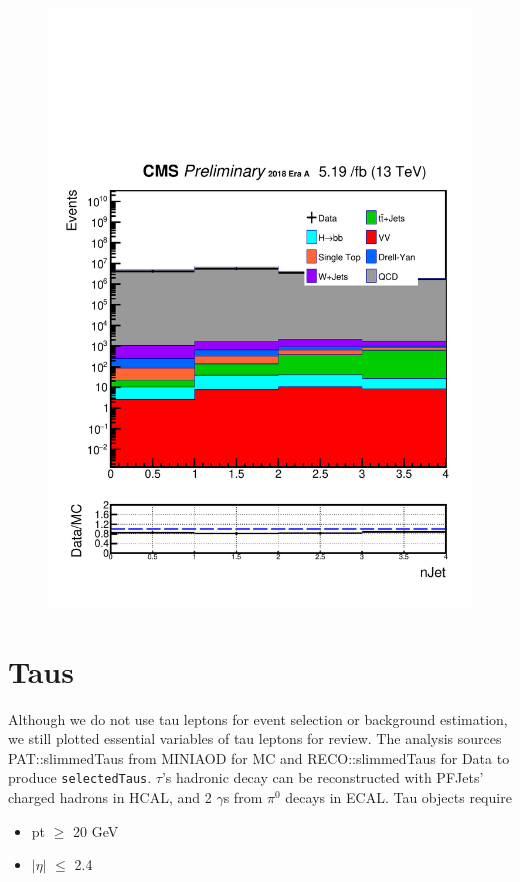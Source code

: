 \begin{figure}[h!]
  \includegraphics[width=0.47\linewidth]{figs/Data_log_AnalysisNote_MS-15_ctauS-10_nJet.pdf}
\end{figure}

\section{Taus}\label{sec:taus}
Although we do not use tau leptons for event selection or background estimation, we still plotted essential variables of tau leptons for review.
The analysis sources PAT::slimmedTaus from MINIAOD for MC and RECO::slimmedTaus for Data to produce {\tt selectedTaus}.
$\tau$'s hadronic decay can be reconstructed with PFJets' charged hadrons in HCAL, and 2 $\gamma$s from $\pi^{0}$ decays in ECAL.
Tau objects require
\begin{itemize}
  \item pt $\geq$ 20 GeV
  \item $|\eta|$ $\leq$ 2.4
\end{itemize}

